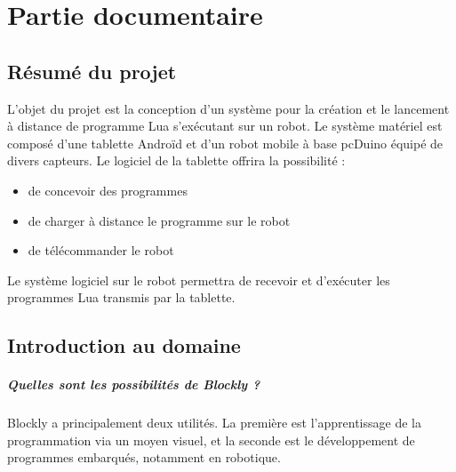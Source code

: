 \documentclass[12pt,francais]{report}
\begin{document}
	
		
		
\tableofcontents


		
\chapter*{Partie documentaire}	


\section*{Résumé du projet}	


L’objet du projet est la conception d'un système pour la création et le lancement à distance de programme Lua s'exécutant sur un robot. Le système matériel est composé d'une tablette Androïd et d'un robot mobile à base pcDuino équipé de divers capteurs. Le logiciel de la tablette offrira la possibilité : 
\begin{itemize}
\item de concevoir des programmes
\item de charger à distance le programme sur le robot 
\item de télécommander le robot 
\end{itemize} 
Le système logiciel sur le robot permettra de recevoir et d'exécuter les programmes Lua transmis par la tablette.
		
\newpage 
\section*{Introduction au domaine}

\paragraph*{Quelles sont les possibilités de Blockly ?\\}

Blockly a principalement deux utilités. La première est l'apprentissage de la programmation via un moyen visuel, et la seconde est le développement de programmes embarqués, notamment en robotique.
	
\end{document}
